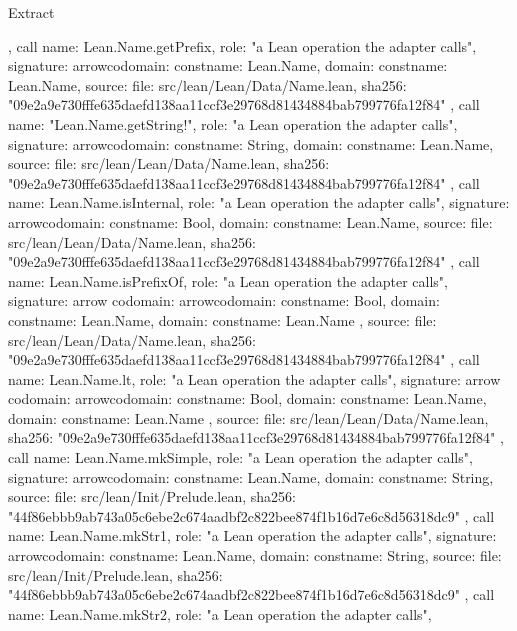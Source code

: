 \begin{lexlean}{Extract}
\begin{toolingmodule}
{{{      }
    },
    call{
      name: Lean.Name.getPrefix,
      role: "a Lean operation the adapter calls",
      signature: arrow{codomain: const{name: Lean.Name}, domain: const{name: Lean.Name}},
      source: {
        file: src/lean/Lean/Data/Name.lean,
        sha256: "09e2a9e730fffe635daefd138aa11ccf3e29768d81434884bab799776fa12f84"
      }
    },
    call{
      name: "Lean.Name.getString!",
      role: "a Lean operation the adapter calls",
      signature: arrow{codomain: const{name: String}, domain: const{name: Lean.Name}},
      source: {
        file: src/lean/Lean/Data/Name.lean,
        sha256: "09e2a9e730fffe635daefd138aa11ccf3e29768d81434884bab799776fa12f84"
      }
    },
    call{
      name: Lean.Name.isInternal,
      role: "a Lean operation the adapter calls",
      signature: arrow{codomain: const{name: Bool}, domain: const{name: Lean.Name}},
      source: {
        file: src/lean/Lean/Data/Name.lean,
        sha256: "09e2a9e730fffe635daefd138aa11ccf3e29768d81434884bab799776fa12f84"
      }
    },
    call{
      name: Lean.Name.isPrefixOf,
      role: "a Lean operation the adapter calls",
      signature: arrow{
        codomain: arrow{codomain: const{name: Bool}, domain: const{name: Lean.Name}},
        domain: const{name: Lean.Name}
      },
      source: {
        file: src/lean/Lean/Data/Name.lean,
        sha256: "09e2a9e730fffe635daefd138aa11ccf3e29768d81434884bab799776fa12f84"
      }
    },
    call{
      name: Lean.Name.lt,
      role: "a Lean operation the adapter calls",
      signature: arrow{
        codomain: arrow{codomain: const{name: Bool}, domain: const{name: Lean.Name}},
        domain: const{name: Lean.Name}
      },
      source: {
        file: src/lean/Lean/Data/Name.lean,
        sha256: "09e2a9e730fffe635daefd138aa11ccf3e29768d81434884bab799776fa12f84"
      }
    },
    call{
      name: Lean.Name.mkSimple,
      role: "a Lean operation the adapter calls",
      signature: arrow{codomain: const{name: Lean.Name}, domain: const{name: String}},
      source: {
        file: src/lean/Init/Prelude.lean,
        sha256: "44f86ebbb9ab743a05c6ebe2c674aadbf2c822bee874f1b16d7e6c8d56318dc9"
      }
    },
    call{
      name: Lean.Name.mkStr1,
      role: "a Lean operation the adapter calls",
      signature: arrow{codomain: const{name: Lean.Name}, domain: const{name: String}},
      source: {
        file: src/lean/Init/Prelude.lean,
        sha256: "44f86ebbb9ab743a05c6ebe2c674aadbf2c822bee874f1b16d7e6c8d56318dc9"
      }
    },
    call{
      name: Lean.Name.mkStr2,
      role: "a Lean operation the adapter calls",
}}
\end{toolingmodule}
\end{lexlean}
